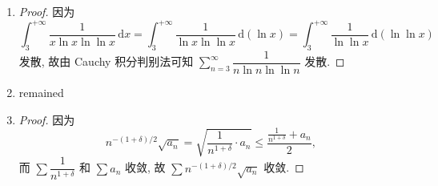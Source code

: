 \begin{enumerate}
\begin{proof}
            因此
            \[
                \frac{1}{n\ln{n}} < \frac{1}{\ln{n!}},    
            \]
            又 $\sum\dfrac{1}{n\ln{n}}$ 可由 Cauchy 积分判别法知道是发散的, 故 $\sum\dfrac{1}{\ln{n!}}$ 也是发散的.
        \end{proof}
    \item %
        \begin{proof}
            因为
            \[
                \int_3^{+\infty}\frac{1}{x\ln x\ln\ln x}\,\mathrm{d}x = \int_3^{+\infty}\frac{1}{\ln x\ln\ln x}\,\mathrm{d}(\ln x) = \int_3^{+\infty}\frac{1}{\ln\ln x}\,\mathrm{d}(\ln\ln x)    
            \]
            发散, 故由 Cauchy 积分判别法可知 $\sum\limits_{n=3}^\infty\dfrac{1}{n\ln n\ln\ln n}$ 发散.
        \end{proof}
    \item %
        {\color{red}remained}
    \item %
        \begin{proof}
            因为
            \[
                n^{-(1+\delta)/2}\sqrt{a_n} = \sqrt{\frac{1}{n^{1+\delta}}\cdot a_n} \leq \frac{\frac{1}{n^{1+\delta}} + a_n}{2},    
            \]
            而 $\sum\dfrac{1}{n^{1+\delta}}$ 和 $\sum a_n$ 收敛, 故 $\sum n^{-(1+\delta)/2}\sqrt{a_n}$ 收敛.


\end{proof}
\end{enumerate}
